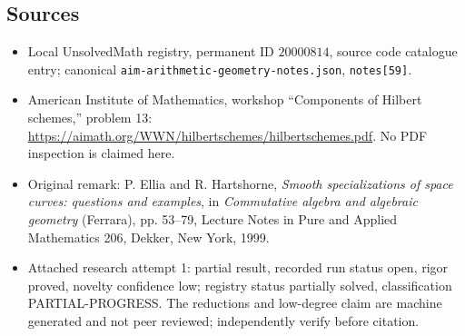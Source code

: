 \documentclass[11pt]{article}
\begin{document}
\subsection{Sources}
\begin{itemize}
\item Local UnsolvedMath registry, permanent ID $20000814$, source code catalogue entry; canonical \texttt{aim-arithmetic-geometry-notes.json}, \texttt{notes[59]}.
\item American Institute of Mathematics, workshop ``Components of Hilbert schemes,'' problem 13: \url{https://aimath.org/WWN/hilbertschemes/hilbertschemes.pdf}. No PDF inspection is claimed here.
\item Original remark: P. Ellia and R. Hartshorne, \emph{Smooth specializations of space curves: questions and examples}, in \emph{Commutative algebra and algebraic geometry} (Ferrara), pp. 53--79, Lecture Notes in Pure and Applied Mathematics 206, Dekker, New York, 1999.
\item Attached research attempt 1: partial result, recorded run status open, rigor proved, novelty confidence low; registry status partially solved, classification PARTIAL-PROGRESS. The reductions and low-degree claim are machine generated and not peer reviewed; independently verify before citation.
\end{itemize}
\end{document}
